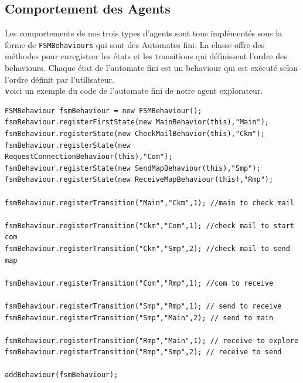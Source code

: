 \documentclass[10pt]{article}
\newcommand\tab[1][0.65cm]{\hspace*{#1}}
\begin{document}
	\subsection{Comportement des Agents}
	Les comportements de nos trois types d'agents sont tous implémentés sous la forme de \texttt{FSMBehaviours} qui sont des Automates fini. La classe offre des méthodes pour enregistrer les états et les transitions qui définissent l'ordre des behaviours.	Chaque état de l'automate fini est un behaviour qui est exécuté selon l'ordre définit par l'utilisateur.\\
\linebreak 
\tab \textbf voici un exemple du code de l'automate fini de notre agent explorateur.
\begin{lstlisting}
FSMBehaviour fsmBehaviour = new FSMBehaviour();
fsmBehaviour.registerFirstState(new MainBehavior(this),"Main");
fsmBehaviour.registerState(new CheckMailBehavior(this),"Ckm");
fsmBehaviour.registerState(new RequestConnectionBehaviour(this),"Com");
fsmBehaviour.registerState(new SendMapBehaviour(this),"Smp");
fsmBehaviour.registerState(new ReceiveMapBehaviour(this),"Rmp");

fsmBehaviour.registerTransition("Main","Ckm",1); //main to check mail

fsmBehaviour.registerTransition("Ckm","Com",1); //check mail to start com
fsmBehaviour.registerTransition("Ckm","Smp",2); //check mail to send map

fsmBehaviour.registerTransition("Com","Rmp",1); //com to receive

fsmBehaviour.registerTransition("Smp","Rmp",1); // send to receive
fsmBehaviour.registerTransition("Smp","Main",2); // send to main

fsmBehaviour.registerTransition("Rmp","Main",1); // receive to explore
fsmBehaviour.registerTransition("Rmp","Smp",2); // receive to send

addBehaviour(fsmBehaviour);
\end{lstlisting}
\end{document}
